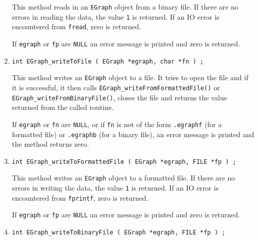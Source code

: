\begin{enumerate}
\begin{verbatim}
\end{verbatim}
\par
This method reads in an {\tt EGraph} object from a binary file.
If there are no errors in reading the data, 
the value {\tt 1} is returned.
If an IO error is encountered from {\tt fread}, zero is returned.
\par {}
If {\tt egraph} or {\tt fp} are {\tt NULL} 
an error message is printed and zero is returned.
\item
\begin{verbatim}
int EGraph_writeToFile ( EGraph *egraph, char *fn ) ;
\end{verbatim}
\par
This method writes an {\tt EGraph} object to a file.
It tries to open the file and if it is successful, 
it then calls {\tt EGraph\_writeFromFormattedFile()} or
{\tt EGraph\_writeFromBinaryFile()},
closes the file
and returns the value returned from the called routine.
\par {}
If {\tt egraph} or {\tt fn} are {\tt NULL}, 
or if {\tt fn} is not of the form
{\tt *.egraphf} (for a formatted file) 
or {\tt *.egraphb} (for a binary file),
an error message is printed and the method returns zero.
\item
\begin{verbatim}
int EGraph_writeToFormattedFile ( EGraph *egraph, FILE *fp ) ;
\end{verbatim}
\par
This method writes an {\tt EGraph} object to a formatted file.
If there are no errors in writing the data, 
the value {\tt 1} is returned.
If an IO error is encountered from {\tt fprintf}, zero is returned.
\par {}
If {\tt egraph} or {\tt fp} are {\tt NULL} 
an error message is printed and zero is returned.
\item
\begin{verbatim}
int EGraph_writeToBinaryFile ( EGraph *egraph, FILE *fp ) ;
\end{verbatim}

\end{enumerate}
